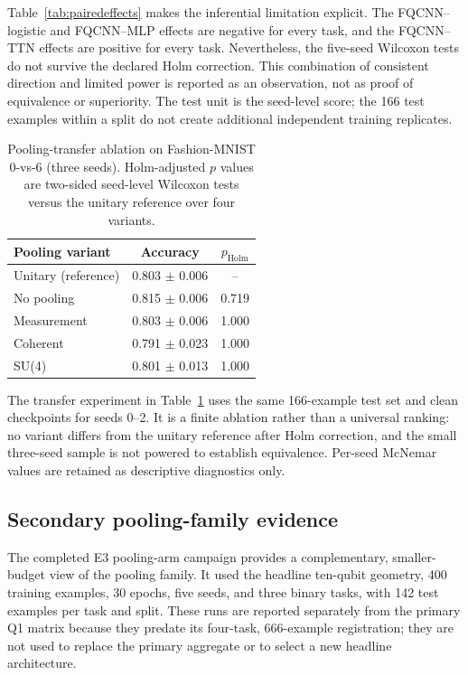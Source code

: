 \documentclass[conference]{IEEEtran}
\begin{document}
Table~\ref{tab:pairedeffects} makes the inferential limitation explicit. The
FQCNN--logistic and FQCNN--MLP effects are negative for every task, and the
FQCNN--TTN effects are positive for every task. Nevertheless, the five-seed
Wilcoxon tests do not survive the declared Holm correction. This combination
of consistent direction and limited power is reported as an observation, not
as proof of equivalence or superiority. The test unit is the seed-level score;
the 166 test examples within a split do not create additional independent
training replicates.

\begin{table}[!t]
\caption{Pooling-transfer ablation on Fashion-MNIST 0-vs-6 (three seeds). Holm-adjusted $p$ values are two-sided seed-level Wilcoxon tests versus the unitary reference over four variants.}
\label{tab:pooling-transfer}
\centering
\begin{tabular}{@{}lcc@{}}
\toprule
\textbf{Pooling variant} & \textbf{Accuracy} & \textbf{$p_{\mathrm{Holm}}$} \\
\midrule
Unitary (reference) & 0.803 $\pm$ 0.006 & -- \\
No pooling & 0.815 $\pm$ 0.006 & 0.719 \\
Measurement & 0.803 $\pm$ 0.006 & 1.000 \\
Coherent & 0.791 $\pm$ 0.023 & 1.000 \\
SU(4) & 0.801 $\pm$ 0.013 & 1.000 \\
\bottomrule
\end{tabular}
\end{table}

The transfer experiment in Table~\ref{tab:pooling-transfer} uses the same 166-example test set and clean checkpoints for seeds 0--2. It is a finite ablation rather than a universal ranking: no variant differs from the unitary reference after Holm correction, and the small three-seed sample is not powered to establish equivalence. Per-seed McNemar values are retained as descriptive diagnostics only.

\subsection{Secondary pooling-family evidence}
The completed E3 pooling-arm campaign provides a complementary, smaller-budget
view of the pooling family. It used the headline ten-qubit geometry, 400
training examples, 30 epochs, five seeds, and three binary tasks, with 142
test examples per task and split. These runs are reported separately from the
primary Q1 matrix because they predate its four-task, 666-example registration;
they are not used to replace the primary aggregate or to select a new
headline architecture.
\end{document}
